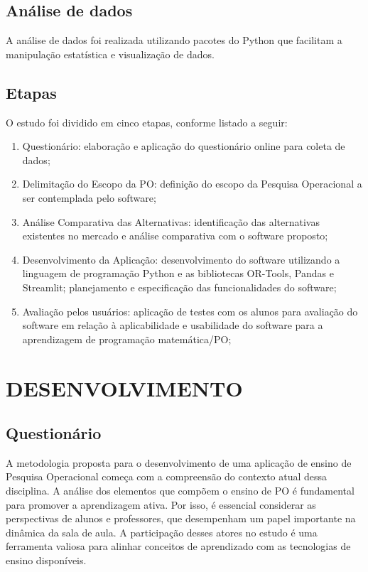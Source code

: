 \documentclass{article}
\begin{document}
\subsection{Análise de dados}

A análise de dados foi realizada utilizando pacotes do Python que facilitam a manipulação estatística e visualização de dados.

\subsection{Etapas}

O estudo foi dividido em cinco etapas, conforme listado a seguir:

\begin{enumerate}
\item Questionário: elaboração e aplicação do questionário online para coleta de dados;
\item Delimitação do Escopo da PO: definição do escopo da Pesquisa Operacional a ser contemplada pelo software;
\item Análise Comparativa das Alternativas: identificação das alternativas existentes no mercado e análise comparativa com o software proposto;
\item Desenvolvimento da Aplicação: desenvolvimento do software utilizando a linguagem de programação Python e as bibliotecas OR-Tools, Pandas e Streamlit; planejamento e especificação das funcionalidades do software;
\item Avaliação pelos usuários: aplicação de testes com os alunos para avaliação do software em relação à aplicabilidade e usabilidade do software para a aprendizagem de programação matemática/PO;
\end{enumerate}

\section{DESENVOLVIMENTO}
\subsection{Questionário}
A metodologia proposta para o desenvolvimento de uma aplicação de ensino de Pesquisa Operacional começa com a compreensão do contexto atual dessa disciplina. A análise dos elementos que compõem o ensino de PO é fundamental para promover a aprendizagem ativa. Por isso, é essencial considerar as perspectivas de alunos e professores, que desempenham um papel importante na dinâmica da sala de aula. A participação desses atores no estudo é uma ferramenta valiosa para alinhar conceitos de aprendizado com as tecnologias de ensino disponíveis.
\end{document}
